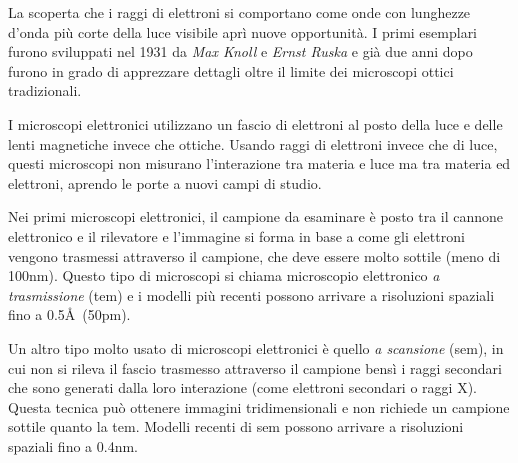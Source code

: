 \documentclass[../main.tex]{subfiles}
\begin{document}
La scoperta che i raggi di elettroni si comportano come onde con lunghezze d'onda più corte della luce visibile aprì nuove opportunità. I primi esemplari furono sviluppati nel 1931 da \textit{Max Knoll} e \textit{Ernst Ruska}\cite{oatley1982early} e già due anni dopo furono in grado di apprezzare dettagli oltre il limite dei microscopi ottici tradizionali.\cite{physics_nobel}

I microscopi elettronici utilizzano un fascio di elettroni al posto della luce e delle lenti magnetiche invece che ottiche. Usando raggi di elettroni invece che di luce, questi microscopi non misurano l'interazione tra materia e luce ma tra materia ed elettroni, aprendo le porte a nuovi campi di studio.

Nei primi microscopi elettronici, il campione da esaminare è posto tra il cannone elettronico e il rilevatore e l'immagine si forma in base a come gli elettroni vengono trasmessi attraverso il campione, che deve essere molto sottile (meno di 100nm). Questo tipo di microscopi si chiama microscopio elettronico \textit{a trasmissione} (\acrshort{tem}) e i modelli più recenti possono arrivare a risoluzioni spaziali fino a 0.5\AA\ (50pm).\cite{rolf_2009}

Un altro tipo molto usato di microscopi elettronici è quello \textit{a scansione} (\acrshort{sem}), in cui non si rileva il fascio trasmesso attraverso il campione bensì i raggi secondari che sono generati dalla loro interazione (come elettroni secondari o raggi X). Questa tecnica può ottenere immagini tridimensionali e non richiede un campione sottile quanto la \acrshort{tem}. Modelli recenti di \acrshort{sem} possono arrivare a risoluzioni spaziali fino a 0.4nm.\cite{hitachi_sem}
\end{document}
